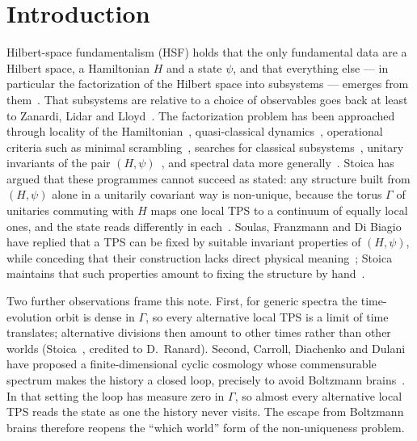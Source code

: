 \documentclass[11pt]{article}
\theoremstyle{definition}
\theoremstyle{remark}
\begin{document}
\section{Introduction}
\label{sec:intro}

Hilbert-space fundamentalism (HSF) holds that the only fundamental data are a Hilbert space, a Hamiltonian $H$ and a state $\psi$, and that everything else --- in particular the factorization of the Hilbert space into subsystems --- emerges from them~\cite{CarrollSingh2021,Stoica2022}. That subsystems are relative to a choice of observables goes back at least to Zanardi, Lidar and Lloyd~\cite{ZLL2004}. The factorization problem has been approached through locality of the Hamiltonian~\cite{CPR2019}, quasi-classical dynamics~\cite{CarrollSingh2021}, operational criteria such as minimal scrambling~\cite{Zanardi2024}, searches for classical subsystems~\cite{Adil2024}, unitary invariants of the pair $(H,\psi)$~\cite{Soulas2025}, and spectral data more generally~\cite{LoizeauSels2024,Cao2026,Kushwaha2026}. Stoica has argued that these programmes cannot succeed as stated: any structure built from $(H,\psi)$ alone in a unitarily covariant way is non-unique, because the torus $\Gamma$ of unitaries commuting with $H$ maps one local TPS to a continuum of equally local ones, and the state reads differently in each~\cite{Stoica2022,Stoica2024,Stoica2026}. Soulas, Franzmann and Di Biagio have replied that a TPS can be fixed by suitable invariant properties of $(H,\psi)$, while conceding that their construction lacks direct physical meaning~\cite{Soulas2025}; Stoica maintains that such properties amount to fixing the structure by hand~\cite{Stoica2026comment}.

Two further observations frame this note. First, for generic spectra the time-evolution orbit is dense in $\Gamma$, so every alternative local TPS is a limit of time translates; alternative divisions then amount to other times rather than other worlds (Stoica~\cite[Remark~11]{Stoica2022}, credited to D.~Ranard). Second, Carroll, Diachenko and Dulani have proposed a finite-dimensional cyclic cosmology whose commensurable spectrum makes the history a closed loop, precisely to avoid Boltzmann brains~\cite{CDD2026}. In that setting the loop has measure zero in $\Gamma$, so almost every alternative local TPS reads the state as one the history never visits. The escape from Boltzmann brains therefore reopens the ``which world'' form of the non-uniqueness problem.
\end{document}
